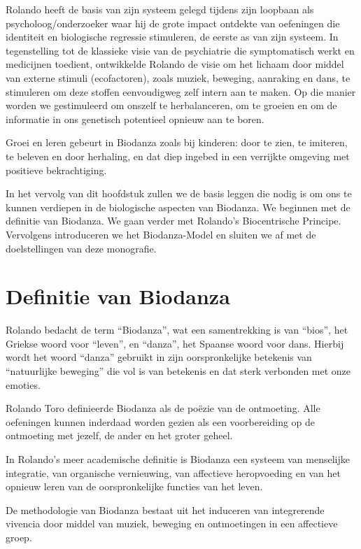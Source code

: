 \documentclass[
  11pt,
]{book}
\begin{document}
Rolando heeft de basis van zijn systeem gelegd tijdens zijn loopbaan als psycholoog/onderzoeker waar hij de grote impact ontdekte van oefeningen die identiteit en biologische regressie stimuleren, de eerste as van zijn systeem. In tegenstelling tot de klassieke visie van de psychiatrie die symptomatisch werkt en medicijnen toedient, ontwikkelde Rolando de visie om het lichaam door middel van externe stimuli (ecofactoren), zoals muziek, beweging, aanraking en dans, te stimuleren om deze stoffen eenvoudigweg zelf intern aan te maken. Op die manier worden we gestimuleerd om onszelf te herbalanceren, om te groeien en om de informatie in ons genetisch potentieel opnieuw aan te boren.

Groei en leren gebeurt in Biodanza zoals bij kinderen: door te zien, te imiteren, te beleven en door herhaling, en dat diep ingebed in een verrijkte omgeving met positieve bekrachtiging.

In het vervolg van dit hoofdstuk zullen we de basis leggen die nodig is om ons te kunnen verdiepen in de biologische aspecten van Biodanza. We beginnen met de definitie van Biodanza. We gaan verder met Rolando's Biocentrische Principe. Vervolgens introduceren we het Biodanza-Model en sluiten we af met de doelstellingen van deze monografie.

\hypertarget{definitie-van-biodanza}{%
\section{Definitie van Biodanza}\label{definitie-van-biodanza}}

Rolando bedacht de term ``Biodanza'', wat een samentrekking is van ``bios'', het Griekse woord voor ``leven'', en ``danza'', het Spaanse woord voor dans. Hierbij wordt het woord ``danza'' gebruikt in zijn oorspronkelijke betekenis van ``natuurlijke beweging'' die vol is van betekenis en dat sterk verbonden met onze emoties.

Rolando Toro definieerde Biodanza als de poëzie van de ontmoeting. Alle oefeningen kunnen inderdaad worden gezien als een voorbereiding op de ontmoeting met jezelf, de ander en het groter geheel.

In Rolando's meer academische definitie is Biodanza een systeem van menselijke integratie, van organische vernieuwing, van affectieve heropvoeding en van het opnieuw leren van de oorspronkelijke functies van het leven.

De methodologie van Biodanza bestaat uit het induceren van integrerende vivencia door middel van muziek, beweging en ontmoetingen in een affectieve groep.
\end{document}
